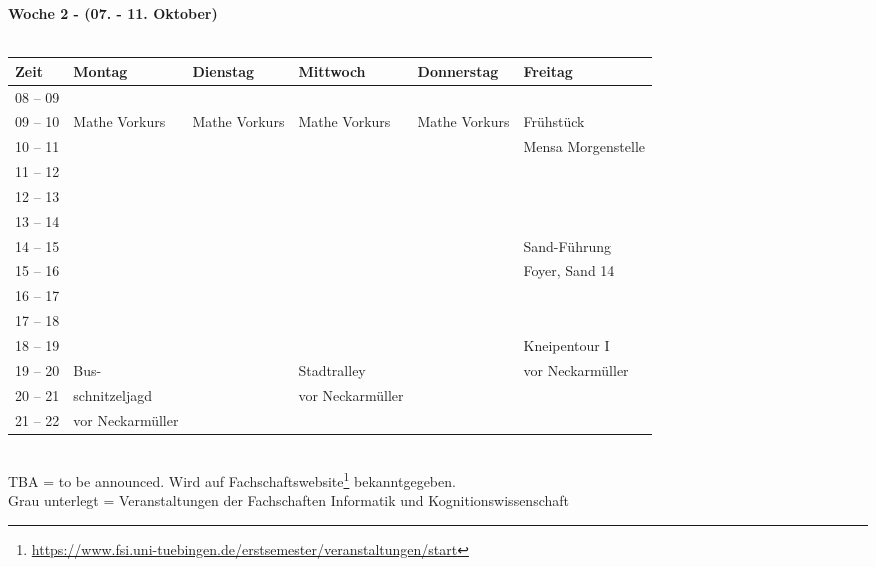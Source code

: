 \textbf{Woche 2 - (07. - 11. Oktober)}\\
\\
\begin{tabular}{|l|p{}|p{}|p{}|p{}|p{}|} \hline
 Zeit & Montag & Dienstag & Mittwoch & Donnerstag & Freitag \\ \hline \hline
 08 -- 09 & & & & & \\ \hline
 09 -- 10 & \footnotesize{Mathe Vorkurs} & \footnotesize{Mathe Vorkurs} & \footnotesize{Mathe Vorkurs} & \footnotesize{Mathe Vorkurs} & \cellcolor{lightlightgray}\footnotesize{Frühstück} \\ \cline{1-1}
 10 -- 11 & & & & & \cellcolor{lightlightgray} \scriptsize{Mensa Morgenstelle}\\ \cline{1-1}
 11 -- 12 & & & & &\\ \cline{1-1}
 12 -- 13 & & & & & \\ \cline{1-1}
 13 -- 14 & & & & & \\ \cline{1-1}
 14 -- 15 & & & & &\footnotesize{Sand-Führung} \cellcolor{lightlightgray} \\ \cline{1-1}
 15 -- 16 & & & & &\scriptsize{Foyer, Sand 14} \cellcolor{lightlightgray} \\ \cline {1-5}
 16 -- 17 & & & & & \\ \cline{1-1}
 17 -- 18 & & & & & \\ \cline{1-1}
 18 -- 19 & & & & &\cellcolor{lightlightgray} \footnotesize{Kneipentour I} \\ \cline{1-1}
 19 -- 20 & \cellcolor{lightlightgray} \footnotesize{Bus-} & &\footnotesize{Stadtralley} \cellcolor{lightlightgray} & &\cellcolor{lightlightgray} \scriptsize{vor Neckarmüller
 } \\ \cline{1-1}
 20 -- 21 & \cellcolor{lightlightgray} \footnotesize{schnitzeljagd} & & \scriptsize{vor Neckarmüller
 } \cellcolor{lightlightgray} & & \cellcolor{lightlightgray} \\ \cline{1-1}
 21 -- 22 & \scriptsize{vor Neckarmüller
 } \cellcolor{lightlightgray} & & \cellcolor{lightlightgray} & &\cellcolor{lightlightgray} \\ \hline
\end{tabular}
\\
\scriptsize{TBA = to be announced. Wird auf Fachschaftswebsite\footnote{\url{https://www.fsi.uni-tuebingen.de/erstsemester/veranstaltungen/start}}  bekanntgegeben.} \\
\scriptsize{Grau unterlegt = Veranstaltungen der Fachschaften Informatik und Kognitionswissenschaft }
\newpage


